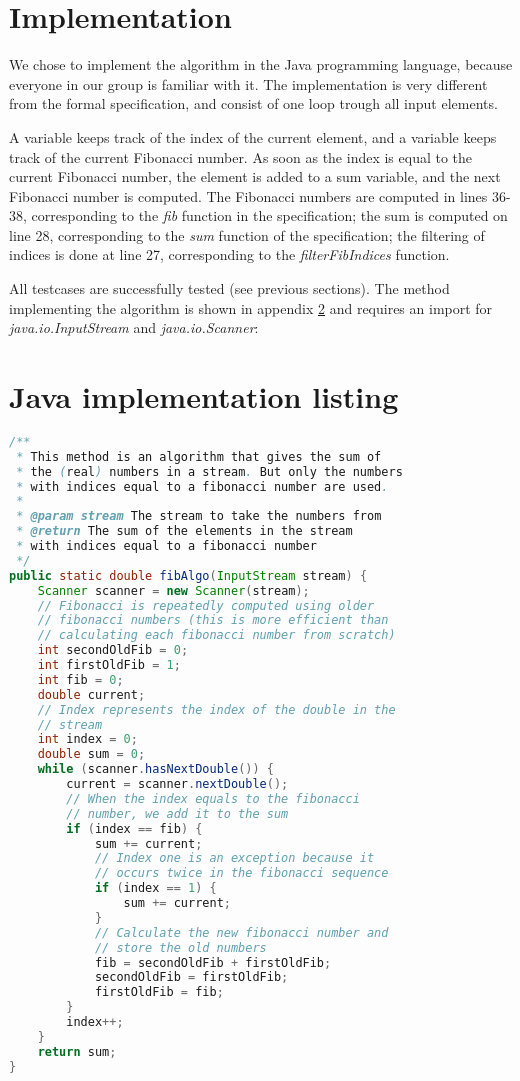\documentclass[12pt]{article}
\begin{document}
\section{Implementation}
We chose to implement the algorithm in the Java programming language, because everyone in our group is familiar with it. The implementation is very different from the formal specification, and consist of one loop trough all input elements.

A variable keeps track of the index of the current element, and a variable keeps track of the current Fibonacci number. As soon as the index is equal to the current Fibonacci number, the element is added to a sum variable, and the next Fibonacci number is computed. The Fibonacci numbers are computed in lines 36-38, corresponding to the \textsl{fib} function in the specification; the sum is computed on line 28, corresponding to the \textsl{sum} function of the specification; the filtering of indices is done at line 27, corresponding to the \textsl{filterFibIndices} function.

All testcases are successfully tested (see previous sections). The method implementing the algorithm is shown in appendix \ref{codelisting} and requires an import for \\ \textsl{java.io.InputStream} and \textsl{java.io.Scanner}:

\appendix

\section{Java implementation listing}
\label{codelisting}
\begin{lstlisting}[language=java,basicstyle=\small]
/**
 * This method is an algorithm that gives the sum of
 * the (real) numbers in a stream. But only the numbers
 * with indices equal to a fibonacci number are used.
 *
 * @param stream The stream to take the numbers from
 * @return The sum of the elements in the stream
 * with indices equal to a fibonacci number
 */
public static double fibAlgo(InputStream stream) {
    Scanner scanner = new Scanner(stream);
    // Fibonacci is repeatedly computed using older
    // fibonacci numbers (this is more efficient than
    // calculating each fibonacci number from scratch)
    int secondOldFib = 0;
    int firstOldFib = 1;
    int fib = 0;
    double current;
    // Index represents the index of the double in the
    // stream
    int index = 0;
    double sum = 0;
    while (scanner.hasNextDouble()) {
        current = scanner.nextDouble();
        // When the index equals to the fibonacci
        // number, we add it to the sum
        if (index == fib) {
            sum += current;
            // Index one is an exception because it
            // occurs twice in the fibonacci sequence
            if (index == 1) {
                sum += current;
            }
            // Calculate the new fibonacci number and
            // store the old numbers
            fib = secondOldFib + firstOldFib;
            secondOldFib = firstOldFib;
            firstOldFib = fib;
        }
        index++;
    }
    return sum;
}
\end{lstlisting}
\end{document}
